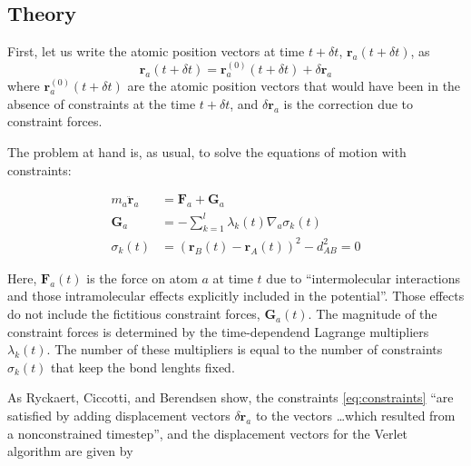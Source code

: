 \subsection{Theory}
\label{sec:shake-theory}
\par First, let us write the atomic position vectors at time $t + \delta t$, $\mathbf{r}_{a}(t + \delta t)$, as 
\begin{equation}
\label{eq:shake-setup}
\mathbf{r}_a(t + \delta t) = \mathbf{r}^{(0)}_a(t + \delta t) + \delta \mathbf{r}_a
\end{equation} 
where  $\mathbf{r}^{(0)}_a(t + \delta t)$ are the atomic position vectors that would have been in the absence of constraints at the time $t + \delta t$, and $\delta \mathbf{r}_a$ is the correction due to constraint forces.
\par The problem at hand is, as usual, to solve the equations of motion with constraints:
\begin{tcolorbox}
	\begin{align}
	\label{eq:shake-eoms}
	m_{a} \ddot{\mathbf{r}}_a &= \mathbf{F}_a + \mathbf{G}_a 				 	\\
	\label{eq:constraint-forces}
	\mathbf{G}_a 	 &= - \sum_{k = 1}^l \lambda_k(t) \nabla_{a} \sigma_k(t)	\\
	\label{eq:constraints}
	\sigma_k(t) 	 &= (\mathbf{r}_B(t) - \mathbf{r}_A(t))^2 - d_{AB}^2 = 0
	\end{align}
\end{tcolorbox}
Here, $\mathbf{F}_a(t)$ is the force on atom $a$ at time $t$ due to ``intermolecular interactions and those intramolecular effects explicitly included in the potential''\cite{allen}. Those effects do not include the fictitious constraint forces, $\mathbf{G}_a(t)$. The magnitude of the constraint forces is determined by the time-dependend Lagrange multipliers $\lambda_k(t)$. The number of these multipliers is equal to the number of constraints $\sigma_k(t)$ that keep the bond lenghts fixed.
\par As Ryckaert,  Ciccotti, and Berendsen \cite{Shake} show, the constraints \ref{eq:constraints} ``are satisfied by adding displacement vectors $\delta \mathbf{r}_a$ to the vectors \ldots which resulted from a nonconstrained timestep'', and the displacement vectors for the Verlet algorithm are given by 
